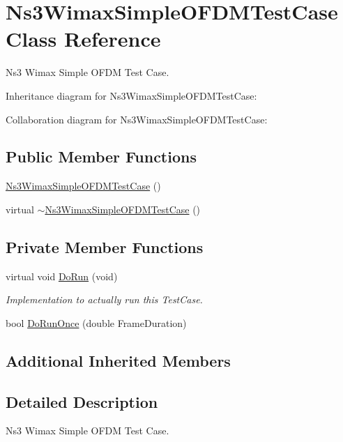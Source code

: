 \hypertarget{classNs3WimaxSimpleOFDMTestCase}{}\section{Ns3\+Wimax\+Simple\+O\+F\+D\+M\+Test\+Case Class Reference}
\label{classNs3WimaxSimpleOFDMTestCase}


Ns3 Wimax Simple O\+F\+DM Test Case.  




Inheritance diagram for Ns3\+Wimax\+Simple\+O\+F\+D\+M\+Test\+Case\+:


Collaboration diagram for Ns3\+Wimax\+Simple\+O\+F\+D\+M\+Test\+Case\+:
\subsection*{Public Member Functions}
\begin{DoxyCompactItemize}
\item 
\hyperlink{classNs3WimaxSimpleOFDMTestCase_ab94eb9c0e7e8b2d894bf0879c41f9f6a}{Ns3\+Wimax\+Simple\+O\+F\+D\+M\+Test\+Case} ()
\item 
virtual \hyperlink{classNs3WimaxSimpleOFDMTestCase_a6e3b392cd4182ae4bfd3bc94c3637e8f}{$\sim$\+Ns3\+Wimax\+Simple\+O\+F\+D\+M\+Test\+Case} ()
\end{DoxyCompactItemize}
\subsection*{Private Member Functions}
\begin{DoxyCompactItemize}
\item 
virtual void \hyperlink{classNs3WimaxSimpleOFDMTestCase_a1374d912c54d968ca0a5f39850d94f6e}{Do\+Run} (void)
\begin{DoxyCompactList}\small\item\em Implementation to actually run this Test\+Case. \end{DoxyCompactList}\item 
bool \hyperlink{classNs3WimaxSimpleOFDMTestCase_af1a886ae823f01f6a9e02f4af8deca26}{Do\+Run\+Once} (double Frame\+Duration)
\end{DoxyCompactItemize}
\subsection*{Additional Inherited Members}


\subsection{Detailed Description}
Ns3 Wimax Simple O\+F\+DM Test Case. 

